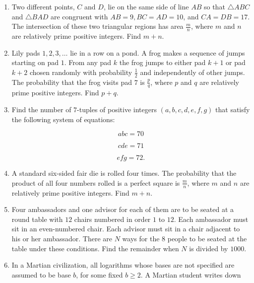 \documentclass{article}
\begin{document}
\begin{enumerate}[label=\arabic*., itemsep=0.5em]\item Two different points, \(C\) and \(D\), lie on the same side of line \(AB\) so that \(\triangle ABC\) and \(\triangle BAD\) are congruent with \(AB=9,BC=AD=10\), and \(CA=DB=17\). The intersection of these two triangular regions has area \(\tfrac{m}{n}\), where \(m\) and \(n\) are relatively prime positive integers. Find \(m+n\).\par \vspace{0.5em}\item Lily pads \(1,2,3,\ldots\) lie in a row on a pond. A frog makes a sequence of jumps starting on pad \(1\). From any pad \(k\) the frog jumps to either pad \(k+1\) or pad \(k+2\) chosen randomly with probability \(\tfrac{1}{2}\) and independently of other jumps. The probability that the frog visits pad \(7\) is \(\tfrac{p}{q}\), where \(p\) and \(q\) are relatively prime positive integers. Find \(p+q\).\par \vspace{0.5em}\item Find the number of \(7\)-tuples of positive integers \((a,b,c,d,e,f,g)\) that satisfy the following system of equations: 

\begin{equation*}
abc=70
\end{equation*}


\begin{equation*}
cde=71
\end{equation*}


\begin{equation*}
efg=72.
\end{equation*}
\par \vspace{0.5em}\item A standard six-sided fair die is rolled four times. The probability that the product of all four numbers rolled is a perfect square is \(\tfrac{m}{n}\), where \(m\) and \(n\) are relatively prime positive integers. Find \(m+n\).\par \vspace{0.5em}\item Four ambassadors and one advisor for each of them are to be seated at a round table with \(12\) chairs numbered in order \(1\) to \(12\). Each ambassador must sit in an even-numbered chair. Each advisor must sit in a chair adjacent to his or her ambassador. There are \(N\) ways for the \(8\) people to be seated at the table under these conditions. Find the remainder when \(N\) is divided by \(1000\).\par \vspace{0.5em}\item In a Martian civilization, all logarithms whose bases are not specified are assumed to be base \(b\), for some fixed \(b\ge2\). A Martian student writes down


\end{enumerate}
\end{document}
